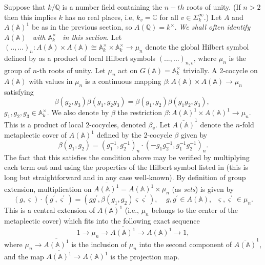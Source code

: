 Suppose that $k/{\mathbb{Q}}$ is a number field containing the $n-th$ roots of
unity. (If $n>2$ then this implies $k$ has no real places, i.e, $k_v=\mathbb{C}$
for all $v\in \Sigma _k^\infty $.)
Let $A$ and $A({\mathbb{A}})^1$ be as in the previous section,
so $A({\mathbb{Q}})=k^\times$.
\emph{We shall often identify }
$A({\mathbb{A}})$
\emph{\ with }
${\mathbb{A}}_k^{\times }$
\emph{\ in this section}. Let
$(..,...)_n:A({\mathbb{A}})\times A({\mathbb{A}})
\cong {\mathbb{A}}_k^{\times }\times {\mathbb{A}}_k^{\times}\rightarrow \mu _n$
denote the global Hilbert symbol defined by
\cite[section XIII.5, proposition 7]{W1} as a product of local
Hilbert symbols $(...,...)_{n,v}$, where
$\mu _n$ is the group of $n$-th roots of unity. Let $\mu _n$ act on 
$G({\mathbb{A}})={\mathbb{A}}_k^{\times }$ trivially.
A 2-cocycle on $A({\mathbb{A}})$ with
values in $\mu _n$ is a continuous mapping
$\beta :A({\mathbb{A}})\times A({\mathbb{A}})\rightarrow \mu _n$ satisfying 
\begin{equation}\label{eq:3.1}
\beta (g_2,g_3)\beta (g_1,g_2g_3)=\beta (g_1,g_2)\beta (g_1g_2,g_3),\;
\end{equation}
$g_1,g_2,g_3\in {\mathbb{A}}_k^{\times }$. We also denote by $\beta $ the
restriction
$\beta :A({\mathbb{A}})^1\times A({\mathbb{A}})^1\rightarrow \mu _n$. This
is a product of local 2-cocycles, denoted $\beta _v$. Let
$\overline{A(\mathbb{A})}^1$ denote the $n$-fold
metaplectic cover of $A({\mathbb{A}})^1$
defined by the 2-cocycle $\beta $ given by 
\begin{equation}\label{eq:3.2}
\beta (g_1,g_2)=(g_1^{-1},g_2^{-1})_n\cdot (-g_1g_2^{-1},g_1^{-1}g_2^{-1})_n.
\end{equation}
The fact that this satisfies the condition above may be verified by
multiplying each term out and using the properties of the Hilbert symbol
listed in \cite[Proposition 60, p. 176]{Sha} (this is long but
straightforward and in any case well-known).
By definition of group extension, multiplication
on $\overline{A({\mathbb{A}})^1}=A({\mathbb{A}})^1\times \mu _n$
(as \emph{sets}) is given by 
\begin{equation}\label{eq:3.3}
(g,\varsigma )\cdot (g^{\prime },\varsigma ^{\prime })=(gg^{\prime },\beta
(g_1,g_2)\varsigma \varsigma ^{\prime }),
\;\;\;\;g,g^{\prime }\in A({\mathbb{A}}),
\;\;\varsigma ,\varsigma ^{\prime }\in \mu _n.
\end{equation}
This is a central extension of $A({\mathbb{A}})^1$ (i.e.,
$\mu _n$ belongs to the
center of the metaplectic cover) which fits into the following exact
sequence 
\[
1\rightarrow \mu _n\rightarrow \overline{A({\mathbb{A}})^1}
\rightarrow A({\mathbb{A}})^1\rightarrow 1,
\]
where $\mu _n\rightarrow \overline{A({\mathbb{A}})^1}$ is the
inclusion of $\mu _n$ into the second component of
$\overline{A({\mathbb{A}})}^1$, and the map
$\overline{A({\mathbb{A}})^1}\rightarrow A({\mathbb{A}})^1$ is the
projection map.

